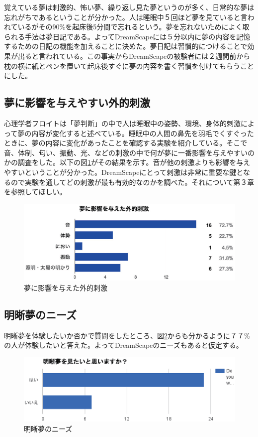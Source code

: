 覚えている夢は刺激的、怖い夢、繰り返し見た夢というのが多く、日常的な夢は忘れがちであるということが分かった。人は睡眠中５回ほど夢を見ていると言われているがその90\%を起床後5分間で忘れるという。夢を忘れないためによく取られる手法は夢日記である\cite{forgetDreams}。よってDreamScapeには５分以内に夢の内容を記憶するための日記の機能を加えることに決めた。夢日記は習慣的につけることで効果が出ると言われている。この事実からDreamScapeの被験者には２週間前から枕の横に紙とペンを置いて起床後すぐに夢の内容を書く習慣を付けてもらうことにした。

\subsection{夢に影響を与えやすい外的刺激}
心理学者フロイトは「夢判断」の中で人は睡眠中の姿勢、環境、身体的刺激によって夢の内容が変化すると述べている\cite{freud}。睡眠中の人間の鼻先を羽毛でくすぐったときに、夢の内容に変化があったことを確認する実験を紹介している。そこで音、体制、匂い、振動、光、などの刺激の中で何が夢に一番影響を与えやすいのかの調査をした。以下の図\ref{externalShigeki}がその結果を示す。音が他の刺激よりも影響を与えやすいということが分かった。DreamScapeにとって刺激は非常に重要な鍵となるので実験を通してどの刺激が最も有効的なのかを調べた。それについて第３章を参照してほしい。

\begin{figure}[htbp]
\begin{center}
\includegraphics[width=15cm]{eps/input.eps}
\caption{夢に影響を与えた外的刺激}
\label{externalShigeki}
\end{center}
\end{figure}

\subsection{明晰夢のニーズ}
明晰夢を体験したいか否かで質問をしたところ、図\ref{lucidNeeds}からも分かるように７７\%の人が体験したいと答えた。よってDreamScapeのニーズもあると仮定する。
\begin{figure}[htbp]
\begin{center}
\includegraphics[width=15cm]{eps/lucidDreamingYesNo.eps}
\caption{明晰夢のニーズ}
\label{lucidNeeds}
\end{center}
\end{figure}

